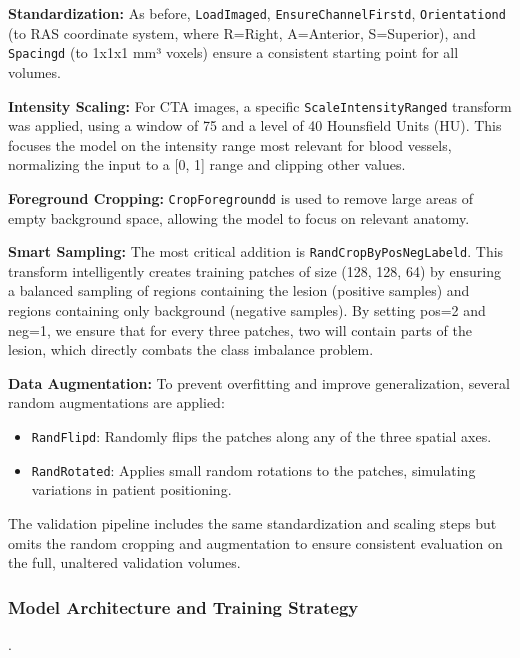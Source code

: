 \textbf{Standardization:} As before, \texttt{LoadImaged}, \texttt{EnsureChannelFirstd}, \texttt{Orientationd} (to RAS coordinate system, where R=Right, A=Anterior, S=Superior), and \texttt{Spacingd} (to 1x1x1 mm³ voxels) ensure a consistent starting point for all volumes.

\textbf{Intensity Scaling:} For CTA images, a specific \texttt{ScaleIntensityRanged} transform was applied, using a window of 75 and a level of 40 Hounsfield Units (HU). This focuses the model on the intensity range most relevant for blood vessels, normalizing the input to a [0, 1] range and clipping other values.

\textbf{Foreground Cropping:} \texttt{CropForegroundd} is used to remove large areas of empty background space, allowing the model to focus on relevant anatomy.

\textbf{Smart Sampling:} The most critical addition is \texttt{RandCropByPosNegLabeld}. This transform intelligently creates training patches of size (128, 128, 64) by ensuring a balanced sampling of regions containing the lesion (positive samples) and regions containing only background (negative samples). By setting pos=2 and neg=1, we ensure that for every three patches, two will contain parts of the lesion, which directly combats the class imbalance problem.

\textbf{Data Augmentation:} To prevent overfitting and improve generalization, several random augmentations are applied:

\begin{itemize}
    \item \texttt{RandFlipd}: Randomly flips the patches along any of the three spatial axes.
    \item \texttt{RandRotated}: Applies small random rotations to the patches, simulating variations in patient positioning.
\end{itemize}

The validation pipeline includes the same standardization and scaling steps but omits the random cropping and augmentation to ensure consistent evaluation on the full, unaltered validation volumes.

\subsubsection{Model Architecture and Training Strategy}
\label{subsubsec:model_training}

. 

